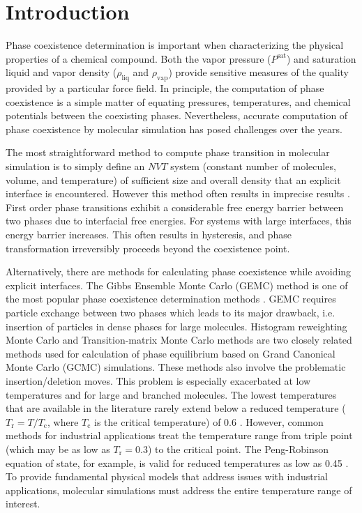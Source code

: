 \documentclass[5p,times]{elsarticle}
\begin{document}
\section{Introduction} \label{sec:introduction}
Phase coexistence determination is important when characterizing the physical properties of a chemical compound. Both the vapor pressure ($P^{\mathrm{sat}}$) and saturation liquid and vapor density ($\rho_{\mathrm{liq}}$ and $\rho_{\mathrm{vap}}$) provide sensitive measures of the quality provided by a particular force field. In principle, the computation of phase coexistence is a simple matter of equating pressures, temperatures, and chemical potentials between the coexisting phases. Nevertheless, accurate computation of phase coexistence by molecular simulation has posed challenges over the years. 

The most straightforward method to compute phase transition in molecular simulation is to simply define an $NVT$ system (constant number of molecules, volume, and temperature) of sufficient size and overall density that an explicit interface is encountered. However this method often results in imprecise results \cite{Frenkel1996}. First order phase transitions exhibit a considerable free energy barrier between two phases due to interfacial free energies. For systems with large interfaces, this energy barrier increases. This often results in hysteresis, and phase transformation irreversibly proceeds beyond the coexistence point. \cite{Frenkel1996} 

Alternatively, there are methods for calculating phase coexistence while avoiding explicit interfaces. The Gibbs Ensemble Monte Carlo (GEMC) method \cite{Panagiotopoulos1987} is one of the most popular phase coexistence determination methods \cite{Paluch2008}.  GEMC requires particle exchange between two phases which leads to its major drawback, i.e. insertion of particles in dense phases for large molecules. Histogram reweighting Monte Carlo and Transition-matrix Monte Carlo methods 
are two closely related methods used for calculation of phase equilibrium based on Grand Canonical Monte Carlo (GCMC) simulations. These methods also involve the problematic insertion/deletion moves. This problem is especially exacerbated  at low temperatures and for large and branched molecules. The lowest temperatures that are available in the literature rarely extend below a reduced temperature ($T_\mathrm{r} = T/T_\mathrm{c}$, where $T_\mathrm{c}$ is the critical temperature) of 0.6 \cite{Martin1998,Potoff2009}. However, common methods for industrial applications treat the temperature range from triple point (which may be as low as $T_\mathrm{r}=0.3$) to the critical point. The Peng-Robinson equation of state, for example, is valid for reduced temperatures as low as 0.45 \cite{Peng1976}. To provide fundamental physical models that address issues with industrial applications, molecular simulations must address the entire temperature range of interest. 
\end{document}
